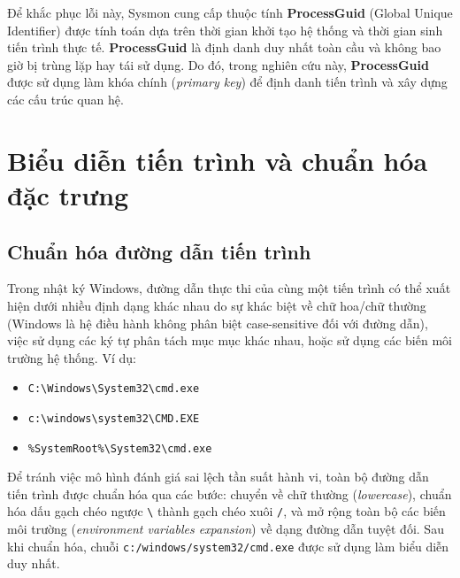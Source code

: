 ﻿\documentclass[../main.tex]{subfiles}
\begin{document}
Để khắc phục lỗi này, Sysmon cung cấp thuộc tính \textbf{ProcessGuid} (Global Unique Identifier) được tính toán dựa trên thời gian khởi tạo hệ thống và thời gian sinh tiến trình thực tế. \textbf{ProcessGuid} là định danh duy nhất toàn cầu và không bao giờ bị trùng lặp hay tái sử dụng. Do đó, trong nghiên cứu này, \textbf{ProcessGuid} được sử dụng làm khóa chính (\textit{primary key}) để định danh tiến trình và xây dựng các cấu trúc quan hệ.

\section{Biểu diễn tiến trình và chuẩn hóa đặc trưng}
\label{section:1.2}

\subsection{Chuẩn hóa đường dẫn tiến trình}
\label{subsection:1.2.1}
Trong nhật ký Windows, đường dẫn thực thi của cùng một tiến trình có thể xuất hiện dưới nhiều định dạng khác nhau do sự khác biệt về chữ hoa/chữ thường (Windows là hệ điều hành không phân biệt case-sensitive đối với đường dẫn), việc sử dụng các ký tự phân tách mục mục khác nhau, hoặc sử dụng các biến môi trường hệ thống. Ví dụ:
\begin{itemize}
    \item \texttt{C:\textbackslash Windows\textbackslash System32\textbackslash cmd.exe}
    \item \texttt{c:\textbackslash windows\textbackslash system32\textbackslash CMD.EXE}
    \item \texttt{\%SystemRoot\%\textbackslash System32\textbackslash cmd.exe}
\end{itemize}
Để tránh việc mô hình đánh giá sai lệch tần suất hành vi, toàn bộ đường dẫn tiến trình được chuẩn hóa qua các bước: chuyển về chữ thường (\textit{lowercase}), chuẩn hóa dấu gạch chéo ngược \texttt{\textbackslash} thành gạch chéo xuôi \texttt{/}, và mở rộng toàn bộ các biến môi trường (\textit{environment variables expansion}) về dạng đường dẫn tuyệt đối. Sau khi chuẩn hóa, chuỗi \texttt{c:/windows/system32/cmd.exe} được sử dụng làm biểu diễn duy nhất.
\end{document}
